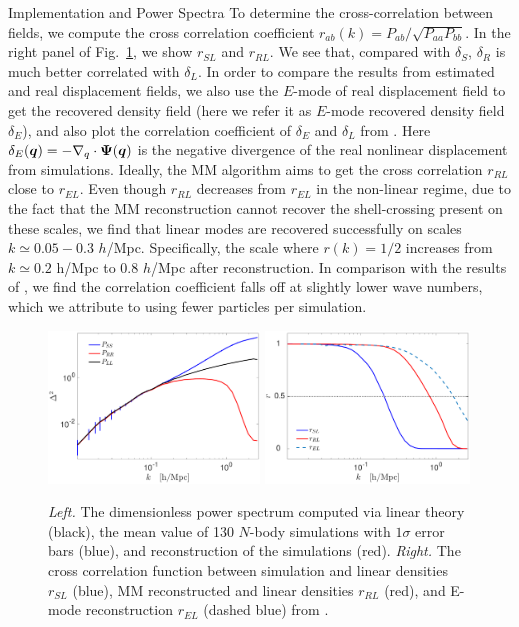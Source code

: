 \begin{section}{Implementation and Power Spectra}
 To determine the cross-correlation
 between fields, we compute the cross correlation coefficient
 $r_{ab}(k) = P_{ab}/\sqrt{P_{aa}P_{bb}}$.  In the right panel of
 Fig.~\ref{fig:cp}, we show $r_{SL}$ and $r_{RL}$.  We see that, compared with $\delta_S$,
 $\delta_R$ is much better correlated with $\delta_L$. In order to
 compare the results from estimated and real displacement fields,
 we also use the $E$-mode of real displacement field to get the recovered
 density field \cite{bib:Yu2016} (here we refer it as $E$-mode recovered density
 field $\delta_E$), and also plot the 
 correlation coefficient of $\delta_E$ 
 and $\delta_L$ from \citet{bib:Yu2016}. 
 Here $\delta_E(\boldsymbol{q})= - \nabla_q \cdot \boldsymbol{\Psi}(\boldsymbol{q})$ is the 
 negative divergence of the real nonlinear displacement from simulations. 
 Ideally, the MM algorithm aims to get the cross correlation $r_{RL}$ close to $r_{EL}$. 
 Even though $r_{RL}$ decreases from $r_{EL}$ in the non-linear regime, due to the fact that the MM reconstruction 
 cannot recover the shell-crossing present on these scales, we find that linear
 modes are recovered successfully on scales $k\simeq 0.05 - 0.3$ $h$/Mpc.
 Specifically, the scale where $r(k)=1/2$ increases from $k\simeq 0.2$ h/Mpc to
 $0.8$ $h$/Mpc after reconstruction.  In comparison with the results of \citet{bib:ZhuH2016},
 we find the correlation coefficient falls off at slightly lower
 wave numbers, which we attribute to using fewer particles per simulation.

  \begin{figure}
    \centering
    \includegraphics[width=0.5\textwidth]{fig2a.pdf}
    \includegraphics[width=0.485\textwidth]{fig2b.pdf}
    \caption{{\it Left.} The dimensionless power spectrum computed via
      linear theory (black), the mean value of 130 $N$-body
      simulations with $1\sigma$ error bars (blue), and reconstruction
      of the simulations (red).  {\it Right.} The cross correlation
      function between simulation and linear densities $r_{SL}$ (blue),
      MM reconstructed and linear densities $r_{RL}$ (red), and E-mode reconstruction $r_{EL}$ (dashed
      blue) from \citet{bib:Yu2016}.}
    \label{fig:cp}
  \end{figure}


\end{section}


